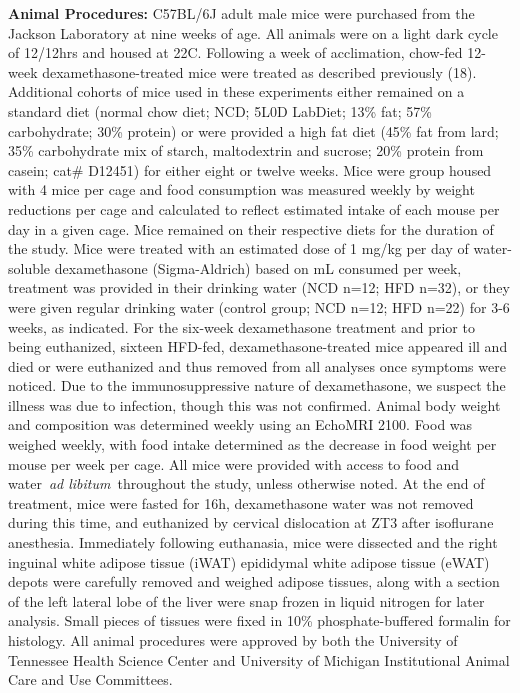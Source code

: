 \documentclass[11pt]{article} %
\begin{document}
\textbf{Animal Procedures:} C57BL/6J adult male mice were purchased from
the Jackson Laboratory at nine weeks of age. All animals were on a light
dark cycle of 12/12hrs and housed at 22\degree C. Following a week of
acclimation, chow-fed 12-week dexamethasone-treated mice were treated as
described previously (18). Additional cohorts of mice used in these
experiments either remained on a standard diet (normal chow diet; NCD;
5L0D LabDiet; 13\% fat; 57\% carbohydrate; 30\% protein) or were
provided a high fat diet (45\% fat from lard; 35\% carbohydrate mix of
starch, maltodextrin and sucrose; 20\% protein from casein; cat\#
D12451) for either eight or twelve weeks. Mice were group housed with 4
mice per cage and food consumption was measured weekly by weight
reductions per cage and calculated to reflect estimated intake of each
mouse per day in a given cage. Mice remained on their respective diets
for the duration of the study. Mice were treated with an estimated dose
of 1 mg/kg per day of water-soluble dexamethasone (Sigma-Aldrich) based
on mL consumed per week, treatment was provided in their drinking water
(NCD n=12; HFD n=32), or they were given regular drinking water (control
group; NCD n=12; HFD n=22) for 3-6 weeks, as indicated. For the six-week
dexamethasone treatment and prior to being euthanized, sixteen HFD-fed,
dexamethasone-treated mice appeared ill and died or were euthanized and
thus removed from all analyses once symptoms were noticed. Due to the
immunosuppressive nature of dexamethasone, we suspect the illness was
due to infection, though this was not confirmed. Animal body weight and
composition was determined weekly using an EchoMRI 2100. Food was
weighed weekly, with food intake determined as the decrease in food
weight per mouse per week per cage. All mice were provided with access
to food and water~\emph{ad libitum}~throughout the study, unless
otherwise noted. At the end of treatment, mice were fasted for 16h,
dexamethasone water was not removed during this time, and euthanized by
cervical dislocation at ZT3 after isoflurane anesthesia. Immediately
following euthanasia, mice were dissected and the right inguinal white
adipose tissue (iWAT) epididymal white adipose tissue (eWAT) depots were
carefully removed and weighed adipose tissues, along with a section of
the left lateral lobe of the liver were snap frozen in liquid nitrogen
for later analysis. Small pieces of tissues were fixed in 10\%
phosphate-buffered formalin for histology. All animal procedures were
approved by both the University of Tennessee Health Science Center and
University of Michigan Institutional Animal Care and Use Committees.
\end{document}

